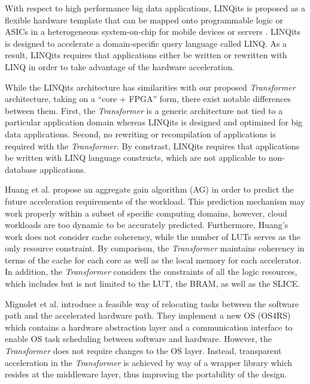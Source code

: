 With respect to high performance big data applications, LINQits is proposed as
a flexible hardware template that can be mapped onto programmable
logic or ASICs in a heterogeneous system-on-chip for mobile devices
or servers \cite{Chung:2013:LBD:2485922.2485945}. LINQits is designed to accelerate a domain-specific query
language called LINQ.  As a result, LINQits requires that applications either be written or rewritten with
LINQ in order to take advantage of the hardware acceleration. 

While the LINQits architecture has similarities with our proposed {\em
  Transformer} architecture, taking on a ``core + FPGA'' form, there exist
notable differences between them. First, the {\em Transformer} is a
generic architecture not tied to a particular application domain
whereas LINQits is designed and optimized for big data applications.
Second, no rewriting or recompilation of applications is required with the {\em Transformer}.  
By constrast, LINQits requires that applications be written with LINQ language
constructs, which are not applicable to non-database applications.

Huang et al. propose an aggregate gain algorithm (AG)
\cite{Huang:2009hs} in order to predict the future acceleration requirements of the
workload. This prediction mechanism may work properly within a subset of specific
 computing domains, however, cloud workloads are too dynamic to be
accurately predicted. Furthermore, Huang's work does not consider cache coherency, while the
number of LUTs serves as the only resource constraint. By comparison, the {\em Transformer}
maintains coherency in terms of the cache for each core as well as the local memory for each accelerator.
In addition, the {\em Transformer} considers the constraints of all the logic resources, which includes 
but is not limited to the LUT, the BRAM, as well as the SLICE.


Mignolet et al. \cite{Mignolet:2003gr} introduce a feasible way of
relocating tasks between the software path and the accelerated hardware
path. They implement a new OS (OS4RS) which contains a hardware
abstraction layer and a communication interface to enable OS task
scheduling between software and hardware. 
However, the {\em Transformer} does not require changes to the OS
layer. Instead, transparent acceleration in the {\em Transformer} is
achieved by way of a wrapper library which resides at the middleware layer,
thus improving the portability of the design.



